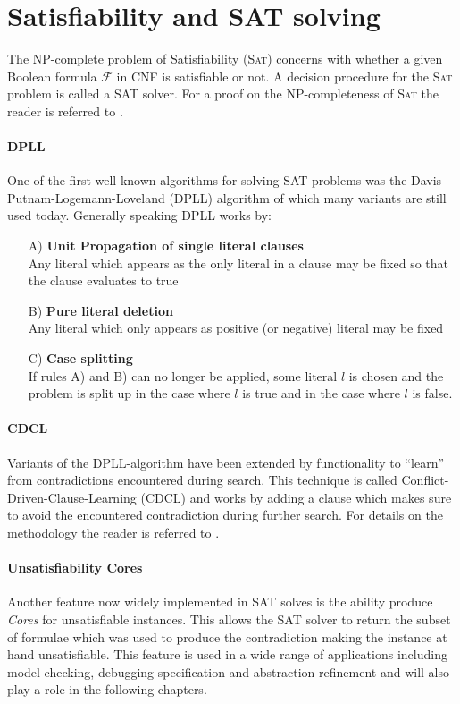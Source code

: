 \section{Satisfiability and SAT solving}
The \textsc{NP}-complete problem of Satisfiability (\textsc{Sat}) concerns with whether a given Boolean formula $\mathcal{F}$ in CNF is satisfiable or not.
A decision procedure for the \textsc{Sat} problem is called a SAT solver.
For a proof on the \textsc{NP}-completeness of \textsc{Sat} the reader is referred to \cite{Garey-Intractability}.

\paragraph{DPLL} One of the first well-known algorithms for solving SAT problems was the Davis\hyp{}Putnam\hyp{}Logemann\hyp{}Loveland (DPLL) algorithm \cite{DPLL} of which many variants are still used today.
Generally speaking DPLL works by:
\begin{itemize}
    \item[A)]   \textbf{Unit Propagation of single literal clauses}\\
                Any literal which appears as the only literal in a clause may be fixed so that the clause evaluates to true
    \item[B)]   \textbf{Pure literal deletion}\\
                Any literal which only appears as positive (or negative) literal may be fixed
    \item[C)]   \textbf{Case splitting}\\
                If rules A) and B) can no longer be applied, some literal $l$ is chosen and the problem is split up in the case where $l$ is true and in the case where $l$ is false.
\end{itemize}

\paragraph{CDCL} Variants of the DPLL-algorithm have been extended by functionality to \enquote{learn} from contradictions encountered during search. This technique is called Conflict\hyp{}Driven\hyp{}Clause\hyp{}Learning (CDCL) and works by adding a clause which makes sure to avoid the encountered contradiction during further search. For details on the methodology the reader is referred to \cite{Grasp}.

\paragraph{Unsatisfiability Cores}
Another feature now widely implemented in SAT solves is the ability produce \textit{Cores} for unsatisfiable instances.
This allows the SAT solver to return the subset of formulae which was used to  produce the contradiction making the instance at hand unsatisfiable. This feature is used in a wide range of applications including model checking, debugging specification and abstraction refinement \cite{Marques-Silva-PropositionalSATSolving} and will also play a role in the following chapters.


